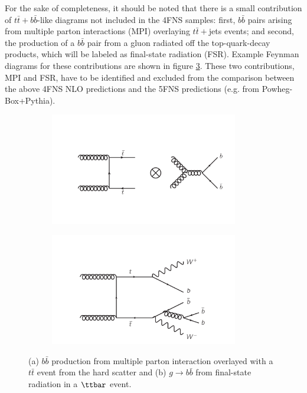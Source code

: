 \ei
 For the sake of completeness, it should be noted that there is a small contribution of $t\bar{t}+b\bar{b}$-like diagrams not included in the 4FNS samples: first, $b\bar{b}$ pairs arising from multiple parton interactions (MPI) overlaying $t\bar{t}+$jets events; and second, the production of a $b\bar{b}$ pair from a gluon radiated off the top-quark-decay products, which will be labeled as final-state radiation (FSR). Example Feynman diagrams for these contributions are shown in figure \ref{fig:dat:ttb:mpifsr}. These two contributions, MPI and FSR, have to be identified and excluded from the comparison between the above 4FNS NLO predictions and the 5FNS predictions (e.g. from {\sc Powheg-Box}+{\sc Pythia}).
 \begin{figure}[t!]
\begin{subfigure}{0.5\textwidth}
  \centering
  \includegraphics[width=0.9\textwidth]{figures/Datasamples/ttbb_MPI_good.pdf}
  \caption{}
  \label{fig:dat:ttb:fsr}
\end{subfigure}
\begin{subfigure}{0.5\textwidth}
  \centering
  \includegraphics[width=0.9\textwidth]{figures/Datasamples/ttbb_FSR_good.pdf}
  \caption{}
  \label{fig:dat:ttb:mpi}
\end{subfigure}

\captionsetup{width=0.85\textwidth} \caption{\small (a) $b\bar{b}$ production from multiple parton interaction overlayed with a $t\bar{t}$ event from the hard scatter and (b) $g\to b\bar{b}$ from final-state radiation in a $\ttbar$ event.}
\label{fig:dat:ttb:mpifsr}
\end{figure}
